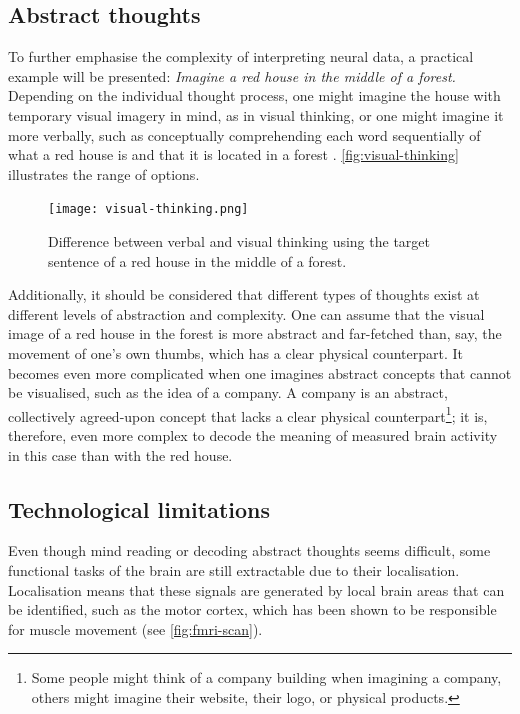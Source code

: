 \subsection{Abstract thoughts}
\label{chapter2-abstract-thoughts}

To further emphasise the complexity of interpreting neural data, a practical example will be presented: \textit{Imagine a red house in the middle of a forest.} Depending on the individual thought process, one might imagine the house with temporary visual imagery in mind, as in visual thinking, or one might imagine it more verbally, such as conceptually comprehending each word sequentially of what a red house is and that it is located in a forest \citep{amit_asymmetrical_2017}. \autoref{fig:visual-thinking} illustrates the range of options.

\begin{figure}[ht]
  \centering
  \texttt{[image: visual-thinking.png]}
  \caption{Difference between verbal and visual thinking using the target sentence of a red house in the middle of a forest.}
  \label{fig:visual-thinking}
\end{figure}

Additionally, it should be considered that different types of thoughts exist at different levels of abstraction and complexity. One can assume that the visual image of a red house in the forest is more abstract and far-fetched than, say, the movement of one’s own thumbs, which has a clear physical counterpart. It becomes even more complicated when one imagines abstract concepts that cannot be visualised, such as the idea of a company. A company is an abstract, collectively agreed-upon concept that lacks a clear physical counterpart\footnote{Some people might think of a company building when imagining a company, others might imagine their website, their logo, or physical products.}; it is, therefore, even more complex to decode the meaning of measured brain activity in this case than with the red house.

\subsection{Technological limitations}
\label{chapter2-technological-limitations}

Even though mind reading or decoding abstract thoughts seems difficult, some functional tasks of the brain are still extractable due to their localisation. Localisation means that these signals are generated by local brain areas that can be identified, such as the motor cortex, which has been shown to be responsible for muscle movement (see \autoref{fig:fmri-scan}).

